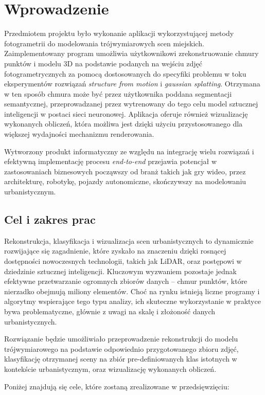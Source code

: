 \section{Wprowadzenie}

Przedmiotem projektu było wykonanie aplikacji wykorzystującej metody fotogrametrii do modelowania trójwymiarowych scen miejskich. Zaimplementowany program umożliwia użytkownikowi zrekonstruowanie chmury punktów i modelu 3D na podstawie podanych na wejściu zdjęć fotogrametrycznych za pomocą dostosowanych do specyfiki problemu w toku eksperymentów rozwiązań \textit{structure from motion} i \textit{gaussian splatting}. Otrzymana w ten sposób chmura może być przez użytkownika poddana segmentacji semantycznej, przeprowadzanej przez wytrenowany do tego celu model sztucznej inteligencji w postaci sieci neuronowej. Aplikacja oferuje również wizualizację wykonanych obliczeń, która możliwa jest dzięki użyciu przystosowanego dla większej wydajności mechanizmu renderowania.

Wytworzony produkt informatyczny ze względu na integrację wielu rozwiązań i efektywną implementację procesu \textit{end-to-end} przejawia potencjał w zastosowaniach biznesowych począwszy od branż takich jak gry wideo, przez architekturę, robotykę, pojazdy autonomiczne, skończywszy na modelowaniu urbanistycznym.

\subsection{Cel i zakres prac}

Rekonstrukcja, klasyfikacja i wizualizacja scen urbanistycznych to dynamicznie rozwijające się zagadnienie, które zyskało na znaczeniu dzięki rosnącej dostępności nowoczesnych technologii, takich jak LiDAR, oraz postępowi w dziedzinie sztucznej inteligencji. Kluczowym wyzwaniem pozostaje jednak efektywne przetwarzanie ogromnych zbiorów danych – chmur punktów, które nierzadko obejmują miliony elementów. Choć na rynku istnieją liczne programy i algorytmy wspierające tego typu analizy, ich skuteczne wykorzystanie w praktyce bywa problematyczne, głównie z uwagi na skalę i złożoność danych urbanistycznych.

Rozwiązanie będzie umożliwiało przeprowadzenie rekonstrukcji do modelu trójwymiarowego na podstawie odpowiednio przygotowanego zbioru zdjęć, klasyfikację otrzymanej sceny na zbiór pre-definiowanych klas istotnych w kontekście urbanistycznym, oraz wizualizację wykonanych obliczeń. 

Poniżej znajdują się cele, które zostaną zrealizowane w przedsięwzięciu:

